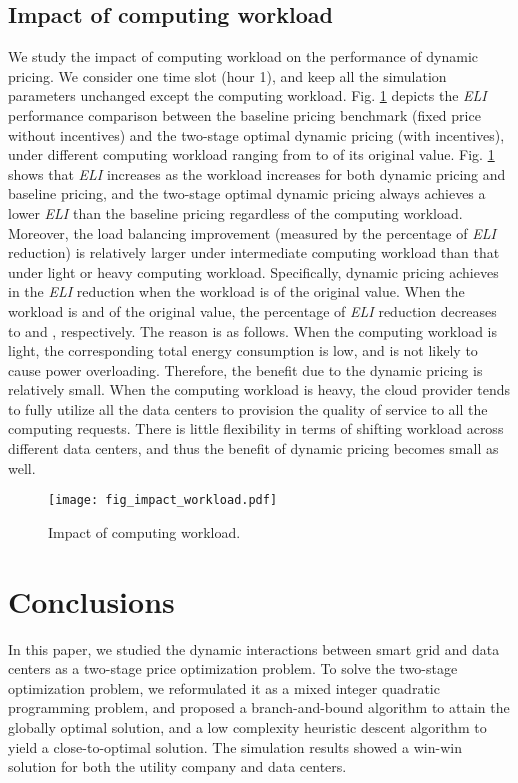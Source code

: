\documentclass[journal]{IEEEtran}
\begin{document}
		
	\subsection{Impact of computing workload}
	We study the impact of computing workload on the performance of dynamic pricing. We consider one time slot (hour 1), and keep all the simulation parameters unchanged except the computing workload. Fig. \ref{fig_impact_workload} depicts the \emph{ELI} performance comparison between the baseline pricing benchmark (fixed price without incentives) and the two-stage optimal dynamic pricing (with incentives), under different computing workload ranging from  to  of its original value. Fig. \ref{fig_impact_workload} shows that \emph{ELI} increases as the workload increases for both dynamic pricing and baseline pricing, and the two-stage optimal dynamic pricing always achieves a lower \emph{ELI} than the baseline pricing regardless of the computing workload. Moreover, the load balancing improvement (measured by the percentage of \emph{ELI} reduction) is relatively larger under intermediate computing workload than that under light or heavy computing workload. Specifically, dynamic pricing achieves  in the \emph{ELI} reduction when the workload is  of the original value. When the workload is  and  of the original value, the percentage of \emph{ELI} reduction decreases to  and , respectively. The reason is as follows. When the computing workload is light, the corresponding total energy consumption is low, and is not likely to cause power overloading. Therefore, the benefit due to the dynamic pricing is relatively small. When the computing workload is heavy, the cloud provider tends to fully utilize all the data centers to provision the quality of service to all the computing requests. There is little flexibility in terms of shifting workload across different data centers, and thus the benefit of dynamic pricing becomes small as well.
	\begin{figure}[tbhp]
		\vspace{-4mm}
		\centering
		\texttt{[image: fig\_impact\_workload.pdf]}
		\caption{\label{fig_impact_workload} Impact of computing workload.}
		\vspace{-4mm}
	\end{figure}
	
	
	\section{Conclusions}
	In this paper, we studied the dynamic interactions between smart grid and data centers as a two-stage price optimization problem. To solve the two-stage optimization problem, we reformulated it as a mixed integer quadratic programming problem, and proposed a branch-and-bound algorithm to attain the globally optimal solution, and a low complexity heuristic descent algorithm to yield a close-to-optimal solution. The simulation results showed a win-win solution for both the utility company and data centers.
	
\end{document}
